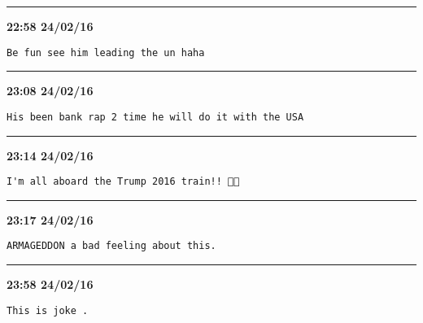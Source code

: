 \hrule%

\begin{adjustwidth}{0cm}{0cm}
\footnotesize \textbf{22:58 24/02/16}

\begin{lstlisting}[breaklines, breakatwhitespace, basicstyle=\small, frame=leftline]
Be fun see him leading the un haha
\end{lstlisting}
\end{adjustwidth}

\hrule%

\begin{adjustwidth}{0cm}{0cm}
\footnotesize \textbf{23:08 24/02/16}

\begin{lstlisting}[breaklines, breakatwhitespace, basicstyle=\small, frame=leftline]
His been bank rap 2 time he will do it with the USA
\end{lstlisting}
\end{adjustwidth}

\hrule%

\begin{adjustwidth}{0cm}{0cm}
\footnotesize \textbf{23:14 24/02/16}

\begin{lstlisting}[breaklines, breakatwhitespace, basicstyle=\small, frame=leftline]
I'm all aboard the Trump 2016 train!! 👏👏
\end{lstlisting}
\end{adjustwidth}

\hrule%

\begin{adjustwidth}{0cm}{0cm}
\footnotesize \textbf{23:17 24/02/16}

\begin{lstlisting}[breaklines, breakatwhitespace, basicstyle=\small, frame=leftline]
ARMAGEDDON a bad feeling about this.
\end{lstlisting}
\end{adjustwidth}

\hrule%

\begin{adjustwidth}{0cm}{0cm}
\footnotesize \textbf{23:58 24/02/16}

\begin{lstlisting}[breaklines, breakatwhitespace, basicstyle=\small, frame=leftline]
This is joke .
\end{lstlisting}
\end{adjustwidth}

